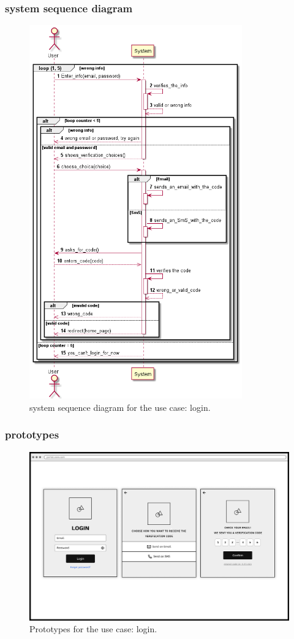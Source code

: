 \documentclass[]{uc2pfecaneva}
\begin{document}
\subsubsection{system sequence diagram}
     \begin{figure}[h]
	
	\centering
	\includegraphics[width=260pt]{images/Login_dss}
	
	\caption{system sequence diagram for the use case: login.}
\end{figure}
\clearpage

\subsubsection{prototypes}
     \begin{figure}[h]
	
	\centering
	\includegraphics[width=\textwidth]{images/login1}
	
	\caption{Prototypes for the use case: login.}
\end{figure}
\clearpage
\end{document}
